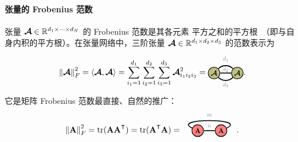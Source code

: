 \paragraph{张量的 Frobenius 范数} 张量 $\bm{\mathcal{A}}\in\mathbb{R}^{d_1\times\cdots\times d_N}$ 的 Frobenius 范数是其各元素
平方之和的平方根~（即与自身内积的平方根）。在张量网络中，三阶张量 $\bm{\mathcal{A}}\in\mathbb{R}^{d_1\times d_2\times d_3}$ 的范数表示为
\begin{align*}
\norm{\At}_F^2 = \langle\At,\At\rangle = 
\sum_{i_1=1}^{d_1}\sum_{i_2=1}^{d_2}\sum_{i_3=1}^{d_3}\At_{i_1i_2i_3}^2
=
\begin{tikzpicture}[baseline=\baseline]
    \tikzset{tensor/.style = {minimum size = 0.5cm,shape = circle,thick,draw=black,inner sep = 0pt}, edge/.style = {thick,line width=.4mm},every loop/.style={}}
    \def\y{0}
    \def\x{0}
    \node[tensor,fill=green!50!red!50!white] (At) at (\x,\y){\scalebox{0.85}{$\At$}};
    \node[tensor,fill=green!50!red!50!white] (At1) at (\x+1,\y){\scalebox{0.85}{$\At$}};
    \draw[edge] (At) -- (At1);
    \draw[edge] (At) to [out=45,in=135] (At1);
    \draw[edge] (At) to [out=-45,in=-135] (At1);
    \node[draw=none] () at (\x+0.5,\y+0.6) {\scalebox{0.7}{\dimcolor{$d_1$}}};
    \node[draw=none] () at (\x+0.5,\y+0.15) {\scalebox{0.7}{\dimcolor{$d_2$}}};
    \node[draw=none] () at (\x+0.5,\y-0.5) {\scalebox{0.7}{\dimcolor{$d_3$}}};
\end{tikzpicture} .
\end{align*}
它是矩阵 Frobenius 范数最直接、自然的推广：
\begin{align*}
 \norm{\Ab}_F^2 = \tr(\Ab\Ab^\ts) = \tr(\Ab^\ts\Ab) =  \hspace*{-0.5cm}
\begin{tikzpicture}[baseline=\baseline]
   \tikzset{tensor/.style = {minimum size = 0.5cm,shape = circle,thick,draw=black,inner sep = 0pt}, edge/.style = {thick,line width=.4mm},every loop/.style={}}
    \def\y{0}
    \def\x{0}
    \node[tensor,fill=red!50!white] (A) at (\x,\y){\scalebox{0.85}{$\Ab$}};
    \node[tensor,fill=red!50!white] (B) at (\x+1,\y){\scalebox{0.85}{$\Ab$}};
    \draw[edge] (A) -- (B) node [midway,above]{\scalebox{0.7}{\dimcolor{$n$}}};
    \draw[edge] (A) to [out=155,in=25, distance=1cm] (B);
    \node[draw=none] () at (\x+0.5,\y+0.65) {\scalebox{0.7}{\dimcolor{$m$}}};
    \end{tikzpicture} \hspace*{-0.5cm}.
\end{align*}


